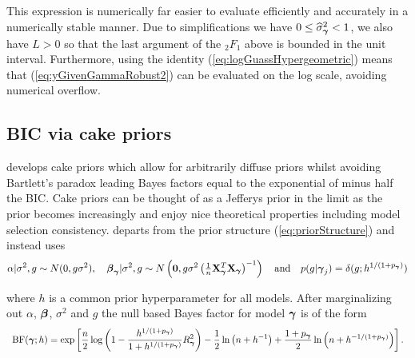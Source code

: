 \documentclass{article}[12pt]
\begin{document}
\noindent This expression is numerically far easier to evaluate efficiently and accurately in a numerically stable manner. Due to simplifications
we have $0\le \widehat{\sigma}_{\boldsymbol \gamma}^2<1$, we also have $L>0$ so that the last argument
of the ${}_2F_1$ above is bounded in the unit interval. Furthermore, using
the identity (\ref{eq:logGuassHypergeometric}) means that (\ref{eq:yGivenGammaRobust2}) can be evaluated
on the log scale, avoiding numerical overflow.





\subsection{BIC via cake priors}  

\cite{OrmerodEtal2017} develops cake priors which allow for arbitrarily diffuse priors
whilst avoiding Bartlett's paradox leading Bayes factors equal to the exponential of minus half
the BIC. Cake priors
can be thought of as a Jefferys prior in the limit
as the prior becomes increasingly
and enjoy nice theoretical properties including model
selection consistency. \cite{OrmerodEtal2017} 
departs from the prior structure (\ref{eq:priorStructure}) and instead uses
\begin{equation}\label{eq:proirs2}
\displaystyle \alpha|\sigma^2,g \sim N(0,g\sigma^2), \quad 
\displaystyle {\boldsymbol\beta}_{\boldsymbol \gamma}|\sigma^2,g \sim N\left( {\bf 0},g\sigma^2\left( \tfrac{1}{n}{\bf X}_{\boldsymbol \gamma}^T{\bf X}_{\boldsymbol \gamma}\right)^{-1}\right)
\quad \mbox{and} \quad
p(g|{\boldsymbol \gamma}_j) = \delta(g; h^{1/(1 + p_{\boldsymbol \gamma})})
\end{equation}

\noindent where $h$ is a common prior hyperparameter for all models. After marginalizing
out $\alpha$, ${\boldsymbol \beta}$, $\sigma^2$ and $g$ the null based Bayes factor 
for model ${\boldsymbol \gamma}$ is of the form
$$
\begin{array}{rl}
\displaystyle \mbox{BF}({\boldsymbol \gamma};h)
=
\exp\left[
\frac{n}{2}\log\left( 1 - \frac{h^{1/(1+p_{\boldsymbol \gamma})}}{1+h^{1/(1+p_{\boldsymbol \gamma})}} R_{\boldsymbol \gamma}^2 \right) 
- \frac{1}{2}\ln\left(n + h^{-1} \right)
+ \frac{1+p_{\boldsymbol \gamma}}{2}\ln\left(n + h^{-1/(1+p_{\boldsymbol \gamma})} \right)
\right].
\end{array}
$$
\end{document}
